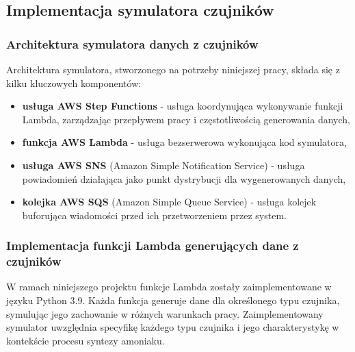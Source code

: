 \subsection{Implementacja symulatora czujników}
\label{subsec:implementacja_symulatora}

\subsubsection{Architektura symulatora danych z czujników}
\label{subsubsec:architektura_symulatora}

Architektura symulatora, stworzonego na potrzeby niniejszej pracy, składa się z kilku kluczowych komponentów:

\begin{itemize}
    \item \textbf{usługa AWS Step Functions} - usługa koordynująca wykonywanie funkcji Lambda, zarządzając przepływem pracy i częstotliwością generowania danych,
    \item \textbf{funkcja AWS Lambda} \cite{aws_lambda_docs} - usługa bezserwerowa wykonująca kod symulatora,
    \item \textbf{usługa AWS SNS} (Amazon Simple Notification Service) \cite{sns_docs} - usługa powiadomień działająca jako punkt dystrybucji dla wygenerowanych danych,
    \item \textbf{kolejka AWS SQS} (Amazon Simple Queue Service) \cite{sqs_docs} - usługa kolejek buforująca wiadomości przed ich przetworzeniem przez system.
\end{itemize}

%

\subsubsection{Implementacja funkcji Lambda generujących dane z czujników}
\label{subsubsec:implementacja_lambda}

W ramach niniejszego projektu funkcje Lambda zostały zaimplementowane w języku Python 3.9. Każda funkcja generuje dane dla określonego typu czujnika,
symulując jego zachowanie w różnych warunkach pracy. Zaimplementowany symulator uwzględnia specyfikę każdego typu czujnika i jego charakterystykę w kontekście procesu syntezy amoniaku.

